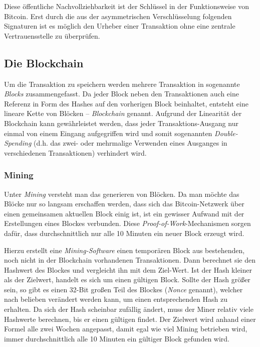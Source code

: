 Diese öffentliche Nachvollziehbarkeit ist der Schlüssel in der Funktionsweise von Bitcoin.
Erst durch die aus der asymmetrischen Verschlüsselung folgenden Signaturen ist es möglich den Urheber einer Transaktion ohne eine zentrale Vertrauensstelle zu überprüfen.

\subsection{Die Blockchain}

Um die Transaktion zu speichern werden mehrere Transaktion in sogenannte \emph{Blocks} zusammengefasst.
Da jeder Block neben den Transaktionen auch eine Referenz in Form des Hashes auf den vorherigen Block beinhaltet, entsteht eine lineare Kette von Blöcken -- \emph{Blockchain} genannt.
Aufgrund der Linearität der Blockchain kann gewährleistet werden, dass jeder Transaktions-Ausgang nur einmal von einem Eingang aufgegriffen wird und somit sogenannten \emph{Double-Spending} (d.h. das zwei- oder mehrmalige Verwenden eines Ausganges in verschiedenen Transaktionen) verhindert wird.

\subsubsection{Mining}

Unter \emph{Mining} versteht man das generieren von Blöcken.
Da man möchte das Blöcke nur so langsam erschaffen werden, dass sich das Bitcoin-Netzwerk über einen gemeinsamen aktuellen Block einig ist, ist ein gewisser Aufwand mit der Erstellungen eines Blockes verbunden.
Diese \emph{Proof-of-Work}-Mechanismen sorgen dafür, dass durchschnittlich nur alle 10 Minuten ein neuer Block erzeugt wird.

Hierzu erstellt eine \emph{Mining-Software} einen temporären Block aus bestehenden, noch nicht in der Blockchain vorhandenen Transaktionen.
Dann berechnet sie den Hashwert des Blockes und vergleicht ihn mit dem Ziel-Wert.
Ist der Hash kleiner als der Zielwert, handelt es sich um einen gültigen Block.
Sollte der Hash größer sein, so gibt es einen 32-Bit großen Teil des Blockes (\emph{Nonce} genannt), welcher nach belieben verändert werden kann, um einen entsprechenden Hash zu erhalten.
Da sich der Hash scheinbar zufällig ändert, muss der Miner relativ viele Hashwerte berechnen, bis er einen gültigen findet.
Der Zielwert wird anhand einer Formel alle zwei Wochen angepasst, damit egal wie viel Mining betrieben wird, immer durchschnittlich alle 10 Minuten ein gültiger Block gefunden wird.

